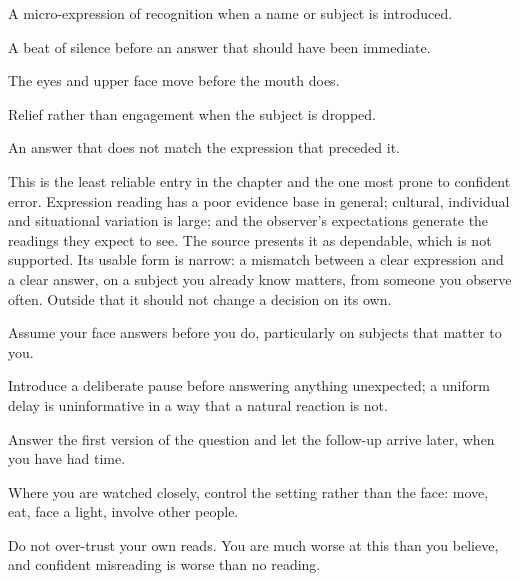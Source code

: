 \begin{feedback}
  \item A micro-expression of recognition when a name or subject is introduced.
  \item A beat of silence before an answer that should have been immediate.
  \item The eyes and upper face move before the mouth does.
  \item Relief rather than engagement when the subject is dropped.
  \item An answer that does not match the expression that preceded it.
\end{feedback}

\begin{failure}
This is the least reliable entry in the chapter and the one most prone to confident error. Expression reading has a poor evidence base in general; cultural, individual and situational variation is large; and the observer's expectations generate the readings they expect to see. The source presents it as dependable, which is not supported. Its usable form is narrow: a mismatch between a clear expression and a clear answer, on a subject you already know matters, from someone you observe often. Outside that it should not change a decision on its own.
\end{failure}

\begin{countermeasures}
  \item Assume your face answers before you do, particularly on subjects that matter to you.
  \item Introduce a deliberate pause before answering anything unexpected; a uniform delay is uninformative in a way that a natural reaction is not.
  \item Answer the first version of the question and let the follow-up arrive later, when you have had time.
  \item Where you are watched closely, control the setting rather than the face: move, eat, face a light, involve other people.
  \item Do not over-trust your own reads. You are much worse at this than you believe, and confident misreading is worse than no reading.
\end{countermeasures}

\seesources
{}
